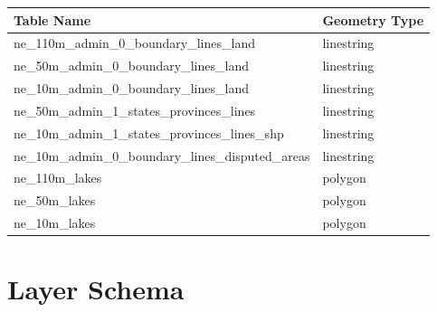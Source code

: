 \begin{flushleft}
    \begin{tabular}{ll}
    \hline
    Table Name                                          & Geometry Type \\
    \hline
    ne\_110m\_admin\_0\_boundary\_lines\_land           & linestring    \\
    ne\_50m\_admin\_0\_boundary\_lines\_land            & linestring    \\
    ne\_10m\_admin\_0\_boundary\_lines\_land            & linestring    \\
    ne\_50m\_admin\_1\_states\_provinces\_lines         & linestring    \\
    ne\_10m\_admin\_1\_states\_provinces\_lines\_shp    & linestring    \\
    ne\_10m\_admin\_0\_boundary\_lines\_disputed\_areas & linestring    \\
    ne\_110m\_lakes                                     & polygon       \\
    ne\_50m\_lakes                                      & polygon       \\
    ne\_10m\_lakes                                      & polygon       \\
    \end{tabular}
\end{flushleft}

\newpage
\section{Layer Schema}\label{layer-schema}

